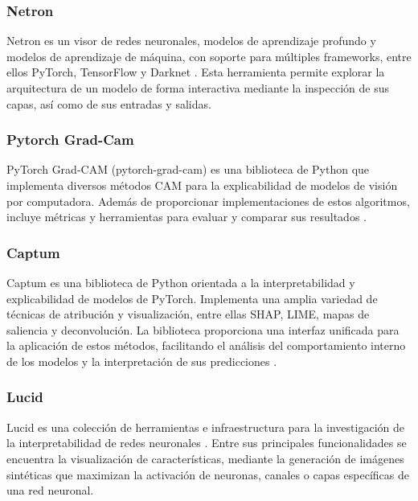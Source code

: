 \subsubsection{Netron}
Netron es un visor de redes neuronales, modelos de aprendizaje profundo y modelos de aprendizaje de 
máquina, con soporte para múltiples frameworks, entre ellos PyTorch, TensorFlow y Darknet 
\parencite{netron}. Esta herramienta permite explorar la arquitectura de un modelo de forma 
interactiva mediante la inspección de sus capas, así como de sus entradas y salidas.

\subsubsection{Pytorch Grad-Cam}
PyTorch Grad-CAM (pytorch-grad-cam) es una biblioteca de Python que implementa diversos métodos CAM 
para la explicabilidad de modelos de visión por computadora. Además de proporcionar implementaciones 
de estos algoritmos, incluye métricas y herramientas para evaluar y comparar sus resultados 
\parencite{pytorch-grad-cam}.

\subsubsection{Captum}
Captum es una biblioteca de Python orientada a la interpretabilidad y explicabilidad de modelos de 
PyTorch. Implementa una amplia variedad de técnicas de atribución y visualización, entre ellas SHAP, 
LIME, mapas de saliencia y deconvolución. La biblioteca proporciona una interfaz unificada para la 
aplicación de estos métodos, facilitando el análisis del comportamiento interno de los modelos y 
la interpretación de sus predicciones \parencite{captum}.

\subsubsection{Lucid}
Lucid es una colección de herramientas e infraestructura para la investigación de la 
interpretabilidad de redes neuronales \parencite{lucid}. Entre sus principales funcionalidades se encuentra la 
visualización de características, mediante la generación de 
imágenes sintéticas que maximizan la activación de neuronas, canales o capas específicas de una 
red neuronal.


